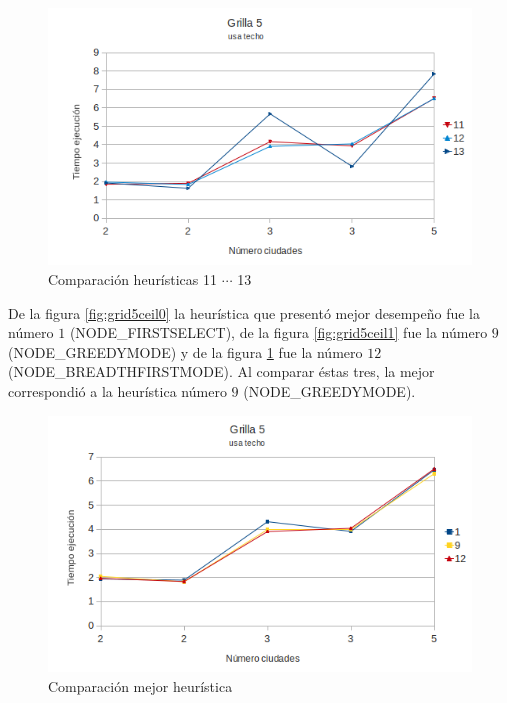 \documentclass[10pt]{article}
\begin{document}
\begin{figure}[ht]
\begin{minipage}[b]{1\linewidth}
  \centering
 \includegraphics[scale=0.4]{grilla5ceil2.png}
 \caption{Comparación heurísticas  11 $\cdots$ 13}
 \label{fig:grid5ceil2}
\end{minipage}

\end{figure}


De la figura \ref{fig:grid5ceil0} la heurística que presentó mejor desempeño fue la número $1$ (NODE\_FIRSTSELECT), de la figura \ref{fig:grid5ceil1} fue la número $9$ (NODE\_GREEDYMODE) y de la 
figura \ref{fig:grid5ceil2} fue la número $12$ (NODE\_BREADTHFIRSTMODE). Al comparar éstas tres, la mejor correspondió a la heurística número $9$ (NODE\_GREEDYMODE).

\begin{figure}[ht]
\begin{minipage}[b]{1\linewidth}
 \centering
 \includegraphics[scale=0.4]{grilla5ceil3.png}
 \caption{Comparación mejor heurística}
 \label{fig:grid5ceil3}
\end{minipage}
\end{figure}
\end{document}
